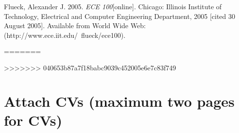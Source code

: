 \documentclass[a4paper, 11pt]{article}
\begin{document}
\begin{footnotesize}
\begin{thebibliography}{11}


   Flueck, Alexander J. 2005. \emph{ECE 100}[online]. Chicago: Illinois Institute of Technology, Electrical and Computer Engineering Department, 2005 [cited 30 August 2005]. Available from World Wide Web: (http://www.ece.iit.edu/~flueck/ece100).

\end{thebibliography}
=======
    
    
    \cite{hosein-2009}


>>>>>>> 040653b87a7f18babc9039c452005e6e7c83f749

\end{footnotesize}


	
	
	\section{Attach CVs (maximum two pages for CVs)}
	
\end{document}
